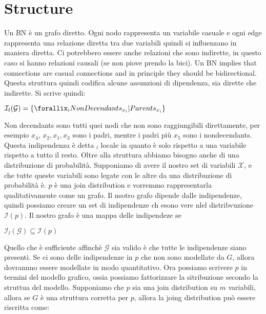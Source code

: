 \section{Structure}
Un BN è un grafo diretto. Ogni nodo rappresenta un variabile casuale e ogni edge rappresenta una relazione diretta tra due variabili quindi si influenzano in maniera diretta. Ci potrebbero essere anche relazioni che sono indirette, in questo caso si hanno relazioni causali (se non piove prendo la bici). \newline
Un BN implies that connections are casual connections and in principle they should be bidirectional. \newline
Questa struttura quindi codifica alcune assunzioni di dipendenza, sia dirette che indirette. Si scrive quindi:
\begin{center}
	$\displaystyle \mathcal{I}_l(\mathcal{G})=\{\forallix_i NonDecendants_{x_i}\vert Parents_{x_i}\}$
\end{center}Non decendants sono tutti quei nodi che non sono raggiungibili direttamente, per esempio $x_4$, $x_2, x_1, x_3$ sono i padri, mentre i padri più $x_5$ sono i nondecendants.\newline
Questa indipendenza è detta ${}_l$ locale in quanto è solo rispetto a una variabile rispetto a tutto il resto.\newline
Oltre alla struttura abbiamo bisogno anche di una distribuzione di probabilità. Supponiamo di avere il nostro set di variabili $\mathcal{X}$, e che tutte queste variabili sono legate con le altre da una distribuzione di probabilità $è$. $p$ è una join distribution e vorremmo rappresentarla qualitativamente come un grafo. Il nsotro grafo dipende dalle indipendenze, quindi possiamo creare un set di indipendenze ch esono vere nlel distribvuzione $\mathcal{I}(p)$. Il nostro grafo è una mappa delle indipendeze se 
\begin{center}
	$\displaystyle \mathcal{I}_l(\mathcal{G})\subseteq\mathcal{I}(p)$
\end{center}
Quello che è sufficiente affinchè $\mathcal{G}$ sia valido è che tutte le indipendenze siano presenti. Se ci sono delle indipendenze in $p$ che non sono modellate da $G$, allora dovrannno essere modellate in modo quantitativo. \newline
Ora possiamo scrivere $p$ in termini del modello grafico, ossia possiamo fattorizzare la sitribuzione secondo la struttua del modello. Supponiamo che $p$ sia una join distribution su $m$ variabili, allora se $G$ è una struttura corretta per $p$, allora la joing distribution può essere riscritta come: 
